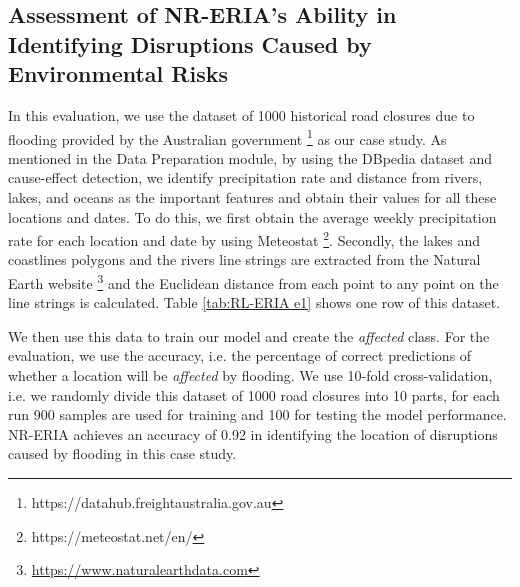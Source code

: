\documentclass[
]{ceurart}
\begin{document}
\subsection{Assessment of NR-ERIA's Ability in Identifying Disruptions Caused by Environmental Risks}

In this evaluation, we use the dataset of 1000 historical road closures due to flooding provided by the Australian government \footnote{https://datahub.freightaustralia.gov.au} as our case study. As mentioned in the Data Preparation module, by using the DBpedia dataset and cause-effect detection, we identify precipitation rate and distance from rivers, lakes, and oceans as the important features and obtain their values for all these locations and dates. To do this, we first obtain the average weekly precipitation rate for each location and date by using Meteostat \footnote{https://meteostat.net/en/}. Secondly, the lakes and coastlines polygons and the rivers line strings are extracted from the Natural Earth website \footnote{\url{https://www.naturalearthdata.com}} and the Euclidean distance from each point to any point on the line strings is calculated. Table \ref{tab:RL-ERIA e1} shows one row of this dataset.

\begin{table}[h]

\caption{1 row of \emph{normal} dataset for 1000 road closures due to flood}
\label{tab:RL-ERIA e1}
  \centering
\end{table}


We then use this data to train our model and create the \textit{affected} class. For the evaluation, we use the accuracy, i.e. the percentage of correct predictions of whether a location will be \textit{affected} by flooding. 
We use 10-fold cross-validation, i.e. we randomly divide this dataset of 1000 road closures into 10 parts, for each run 900 samples are used for training and 100 for testing the model performance. 
NR-ERIA achieves an accuracy of 0.92 in identifying the location of disruptions caused by flooding in this case study.
\end{document}
